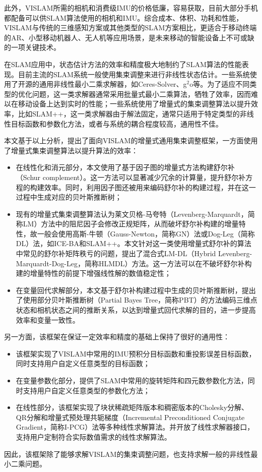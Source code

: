 此外，VISLAM所需的相机和消费级IMU的价格低廉，容易获取，目前大部分手机都配备可以供SLAM算法使用的相机和IMU。综合成本、体积、功耗和性能，VISLAM与传统的三维感知方案或其他类型的SLAM方案相比，更适合于移动终端的AR、小型移动机器人、无人机等应用场景，是未来移动的智能设备上不可或缺的一项关键技术。

在SLAM应用中，状态估计方法的效率和精度极大地制约了SLAM算法的性能表现。目前主流的SLAM系统一般使用集束调整来进行非线性状态估计。一些系统使用了开源的通用非线性最小二乘求解器，如Ceres-Solver\citep{ceres-solver}、g$^2$o\citep{kummerle2011g}等。为了适应不同类型的优化问题，这一类求解器通常采用批量式最小二乘算法，牺牲了效率，因而难以在移动设备上达到实时的性能；一些系统使用了增量式的集束调整算法以提升效率，比如SLAM++\citep{ila2017fast}，这一类求解器由于解法固定，通常只适用于特定类型的非线性目标函数和参数化方法，或者与系统的耦合程度较高，通用性不佳。

本文基于以上分析，提出了面向VISLAM的增量式通用集束调整框架，一方面使用了增量式集束调整算法以提升算法的效率：
\begin{itemize}
    \item 在线性化和消元部分，本文使用了基于因子图的增量式方法构建舒尔补（Schur complement）。这一方法可以显著减少冗余的计算量，提升舒尔补方程的构建效率。同时，利用因子图还被用来编码舒尔补的构建过程，并在这一过程中生成对应的贝叶斯推断树；
    \item 现有的增量式集束调整算法认为莱文贝格-马夸特（Levenberg-Marquardt，简称LM）方法中的阻尼因子会修改正规矩阵，从而破坏舒尔补构建的增量特性，故一般会使用高斯-牛顿（Gauss-Newton，简称GN）法或Dog-Leg（简称DL）法，如ICE-BA\citep{liu2018ice}和SLAM++。本文针对这一类使用增量式舒尔补的算法中常见的舒尔补矩阵秩亏的问题，提出了混合式LM-DL（Hybrid Levenberg-Marquardt-Dog-Leg，简称HLMDL）方法。这一方法可以在不破坏舒尔补构建的增量特性的前提下增强线性解的数值稳定性；
    \item 在变量回代求解部分，本文基于舒尔补构建过程中生成的贝叶斯推断树，提出了使用部分贝叶斯推断树（Partial Bayes Tree，简称PBT）的方法编码三维点状态和相机状态之间的推断关系，以达到增量式回代求解的目的，进一步提高效率和变量一致性。
\end{itemize}

另一方面，该框架在保证一定效率和精度的基础上保持了很好的通用性：
\begin{itemize}
    \item 该框架实现了VISLAM中常用的IMU预积分\citep{forster2017manifold}目标函数和重投影误差目标函数，同时支持用户自定义任意类型的目标函数；
    \item 在变量参数化部分，提供了SLAM中常用的旋转矩阵和四元数参数化方法，同时支持用户自定义任意类型的参数化方法；
    \item 在线性部分，该框架实现了块状稀疏矩阵版本和稠密版本的Cholesky分解、QR分解和增量式预处理共轭梯度（Incremental Preconditioned Conjugate Gradient，简称I-PCG）法等多种线性求解算法。并开放了线性求解器接口，支持用户定制符合实际数值需求的线性求解算法。
\end{itemize}
因此，该框架除了能够求解VISLAM的集束调整问题，也支持求解一般的非线性最小二乘问题。


